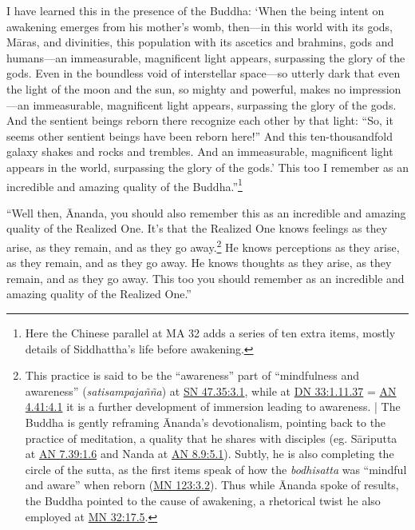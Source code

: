 \documentclass[12pt,openany]{book}%
\begin{document}
I have learned this in the presence of the Buddha: ‘When the being intent on awakening emerges from his mother’s womb, then—in this world with its gods, \textsanskrit{Māras}, and divinities, this population with its ascetics and brahmins, gods and humans—an immeasurable, magnificent light appears, surpassing the glory of the gods. Even in the boundless void of interstellar space—so utterly dark that even the light of the moon and the sun, so mighty and powerful, makes no impression—an immeasurable, magnificent light appears, surpassing the glory of the gods. And the sentient beings reborn there recognize each other by that light: “So, it seems other sentient beings have been reborn here!” And this ten-thousandfold galaxy shakes and rocks and trembles. And an immeasurable, magnificent light appears in the world, surpassing the glory of the gods.’ This too I remember as an incredible and amazing quality of the Buddha.”\footnote{Here the Chinese parallel at MA 32 adds a series of ten extra items, mostly details of Siddhattha’s life before awakening. } 

“Well then, Ānanda, you should also remember this as an incredible and amazing quality of the Realized One. It’s that the Realized One knows feelings as they arise, as they remain, and as they go away.\footnote{This practice is said to be the “awareness” part of “mindfulness and awareness” (\textit{\textsanskrit{satisampajañña}}) at \href{https://suttacentral.net/sn47.35/en/sujato\#3.1}{SN 47.35:3.1}, while at \href{https://suttacentral.net/dn33/en/sujato\#1.11.37}{DN 33:1.11.37} = \href{https://suttacentral.net/an4.41/en/sujato\#4.1}{AN 4.41:4.1} it is a further development of immersion leading to awareness. | The Buddha is gently reframing Ānanda’s devotionalism, pointing back to the practice of meditation, a quality that he shares with disciples (eg. \textsanskrit{Sāriputta} at \href{https://suttacentral.net/an7.39/en/sujato\#1.6}{AN 7.39:1.6} and Nanda at \href{https://suttacentral.net/an8.9/en/sujato\#5.1}{AN 8.9:5.1}). Subtly, he is also completing the circle of the sutta, as the first items speak of how the \textit{bodhisatta} was “mindful and aware” when reborn (\href{https://suttacentral.net/mn123/en/sujato\#3.2}{MN 123:3.2}). Thus while Ānanda spoke of results, the Buddha pointed to the cause of awakening, a rhetorical twist he also employed at \href{https://suttacentral.net/mn32/en/sujato\#17.5}{MN 32:17.5}. } He knows perceptions as they arise, as they remain, and as they go away. He knows thoughts as they arise, as they remain, and as they go away. This too you should remember as an incredible and amazing quality of the Realized One.” 
\end{document}
